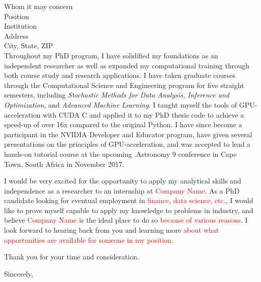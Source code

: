 \documentclass{letter}
\newcommand\toedit[1]{\textcolor{red}{#1}}
\begin{document}
\begin{letter}{Whom it may concern\\
Position \\
Institution\\
Address\\
City, State, ZIP\\
}
\noindent Throughout my PhD program, I have solidified my foundations
as an independent researcher as well as expanded my computational
training through both course study and research applications. I have
taken graduate courses through the Computational Science and
Engineering program for five straight semesters, including
\textit{Stochastic Methods for Data Analysis, Inference and
  Optimization}, and \textit{Advanced Machine Learning}. I taught
myself the tools of GPU-acceleration with CUDA C and applied it to my
PhD thesis code to achieve a speed-up of over 16x compared to the
original Python. I have since become a participant in the NVIDIA
Developer and Educator program, have given several presentations on
the principles of GPU-acceleration, and was accepted to lead a
hands-on tutorial course at the upcoming .Astronomy 9 conference in
Cape Town, South Africa in November 2017.

\noindent I would be very excited for the opportunity to apply my
analytical skills and independence as a researcher to an internship at
\toedit{Company Name}. As a PhD candidate looking for eventual
employment in \toedit{finance, data science, etc.}, I would like to
prove myself capable to apply my knowledge to problems in industry,
and believe \toedit{Company Name} is the ideal place to do so
\toedit{because of various reasons}. I look forward to hearing back
from you and learning more \toedit{about what opportunities are
  available for someone in my position}.

Thank you for your time and consideration.


\closing{Sincerely,}

\end{letter}
\end{document}
